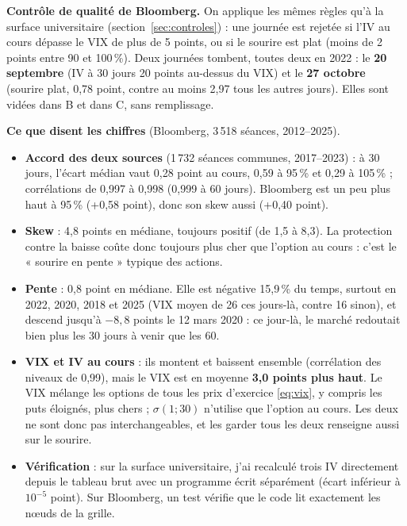 \documentclass[10pt,a4paper]{article}
\begin{document}
\textbf{Contrôle de qualité de Bloomberg.} On applique les mêmes règles qu'à la surface universitaire (section~\ref{sec:controles}) : une journée est rejetée si l'IV au cours dépasse le VIX de plus de 5 points, ou si le sourire est plat (moins de 2 points entre 90 et 100\,\%). Deux journées tombent, toutes deux en 2022 : le \textbf{20 septembre} (IV à 30 jours 20 points au-dessus du VIX) et le \textbf{27 octobre} (sourire plat, 0,78 point, contre au moins 2,97 tous les autres jours). Elles sont vidées dans B et dans C, sans remplissage.

\textbf{Ce que disent les chiffres} (Bloomberg, 3\,518 séances, 2012–2025).
\begin{itemize}[nosep,leftmargin=*]
  \item \textbf{Accord des deux sources} (1\,732 séances communes, 2017–2023) : à 30 jours, l'écart médian vaut 0,28 point au cours, 0,59 à 95\,\% et 0,29 à 105\,\% ; corrélations de 0,997 à 0,998 (0,999 à 60 jours). Bloomberg est un peu plus haut à 95\,\% (+0,58 point), donc son skew aussi (+0,40 point).
  \item \textbf{Skew} : 4,8 points en médiane, toujours positif (de 1,5 à 8,3). La protection contre la baisse coûte donc toujours plus cher que l'option au cours : c'est le « sourire en pente » typique des actions.
  \item \textbf{Pente} : 0,8 point en médiane. Elle est négative 15,9\,\% du temps, surtout en 2022, 2020, 2018 et 2025 (VIX moyen de 26 ces jours-là, contre 16 sinon), et descend jusqu'à $-8{,}8$ points le 12 mars 2020 : ce jour-là, le marché redoutait bien plus les 30 jours à venir que les 60.
  \item \textbf{VIX et IV au cours} : ils montent et baissent ensemble (corrélation des niveaux de 0,99), mais le VIX est en moyenne \textbf{3,0 points plus haut}. Le VIX mélange les options de tous les prix d'exercice \eqref{eq:vix}, y compris les puts éloignés, plus chers ; $\sigma(1;30)$ n'utilise que l'option au cours. Les deux ne sont donc pas interchangeables, et les garder tous les deux renseigne aussi sur le sourire.
  \item \textbf{Vérification} : sur la surface universitaire, j'ai recalculé trois IV directement depuis le tableau brut avec un programme écrit séparément (écart inférieur à $10^{-5}$ point). Sur Bloomberg, un test vérifie que le code lit exactement les nœuds de la grille.
\end{itemize}
\end{document}
